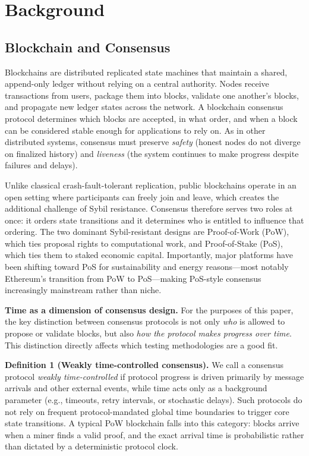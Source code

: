 \section{Background}

\subsection{Blockchain and Consensus}

Blockchains are distributed replicated state machines that maintain a shared, append-only ledger without relying on a central authority. Nodes receive transactions from users, package them into blocks, validate one another's blocks, and propagate new ledger states across the network. A blockchain consensus protocol determines which blocks are accepted, in what order, and when a block can be considered stable enough for applications to rely on. As in other distributed systems, consensus must preserve \emph{safety} (honest nodes do not diverge on finalized history) and \emph{liveness} (the system continues to make progress despite failures and delays).

Unlike classical crash-fault-tolerant replication, public blockchains operate in an open setting where participants can freely join and leave, which creates the additional challenge of Sybil resistance. Consensus therefore serves two roles at once: it orders state transitions and it determines who is entitled to influence that ordering. The two dominant Sybil-resistant designs are Proof-of-Work (PoW), which ties proposal rights to computational work, and Proof-of-Stake (PoS), which ties them to staked economic capital. Importantly, major platforms have been shifting toward PoS for sustainability and energy reasons---most notably Ethereum's transition from PoW to PoS---making PoS-style consensus increasingly mainstream rather than niche.

\smallskip
\noindent\textbf{Time as a dimension of consensus design.}
For the purposes of this paper, the key distinction between consensus protocols is not only \emph{who} is allowed to propose or validate blocks, but also \emph{how the protocol makes progress over time}. This distinction directly affects which testing methodologies are a good fit.

\smallskip
\noindent\textbf{Definition 1 (Weakly time-controlled consensus).}
We call a consensus protocol \emph{weakly time-controlled} if protocol progress is driven primarily by message arrivals and other external events, while time acts only as a background parameter (e.g., timeouts, retry intervals, or stochastic delays). Such protocols do not rely on frequent protocol-mandated global time boundaries to trigger core state transitions. A typical PoW blockchain falls into this category: blocks arrive when a miner finds a valid proof, and the exact arrival time is probabilistic rather than dictated by a deterministic protocol clock.

